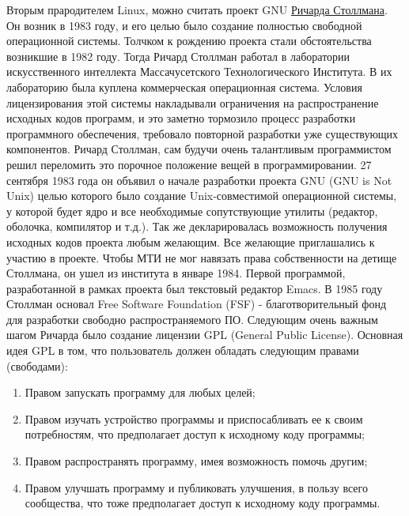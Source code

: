 \documentclass[bachelor, och, referat, times]{SCWorks}
\begin{document}
\par Вторым прародителем Linux, можно считать проект GNU 
\href{https://ru.wikipedia.org/wiki/\%D0\%A1\%D1\%82\%D0\%BE\%D0\%BB\%D0\%
BB\%D0\%BC\%D0\%B0\%D0\%BD,\_\%D0\%A0\%D0\%B8\%D1\%87\%D0\%B0\%D1\%80\%D0
\%B4\_\%D0\%9C\%D1\%8D\%D1\%82\%D1\%82\%D1\%8C\%D1\%8E}{Ричарда 
Столлмана}. Он возник в 1983 году, и его целью было создание полностью 
свободной операционной системы. Толчком к рождению проекта стали 
обстоятельства возникшие в 1982 году. Тогда Ричард Столлман работал в 
лаборатории искусственного интеллекта Массачусетского Технологического 
Института. В их лабораторию была куплена коммерческая операционная 
система. Условия лицензирования этой системы накладывали ограничения на 
распространение исходных кодов программ, и это заметно тормозило процесс 
разработки программного обеспечения, требовало повторной разработки уже 
существующих компонентов. Ричард Столлман, сам будучи очень талантливым 
программистом решил переломить это порочное положение вещей в 
программировании. 27 сентября 1983 года он объявил о начале разработки 
проекта GNU (GNU is Not Unix) целью которого было создание 
Unix-совместимой операционной системы, у которой будет ядро и все 
необходимые сопутствующие утилиты (редактор, оболочка, компилятор и т.д.).
Так же декларировалась возможность получения исходных кодов проекта любым 
желающим. Все желающие приглашались к участию в проекте. Чтобы МТИ не мог 
навязать права собственности на детище Столлмана, он ушел из института в 
январе 1984. Первой программой, разработанной в рамках проекта был 
текстовый редактор Emacs. В 1985 году Столлман основал Free Software 
Foundation (FSF) - благотворительный фонд для разработки свободно 
распространяемого ПО. Следующим очень важным шагом Ричарда было создание 
лицензии GPL (General Public License). Основная идея GPL в том, что 
пользователь должен обладать следующим правами (свободами):
	\begin{enumerate}
		\item Правом запускать программу для любых целей;
		\item Правом изучать устройство программы и приспосабливать ее к 
		своим потребностям, что предполагает доступ к исходному коду 
		программы;
		\item Правом распространять программу, имея возможность помочь 
		другим;
		\item Правом улучшать программу и публиковать улучшения, в пользу 
		всего сообщества, что тоже предполагает доступ к исходному коду 
		программы.
	\end{enumerate}
	
\end{document}
